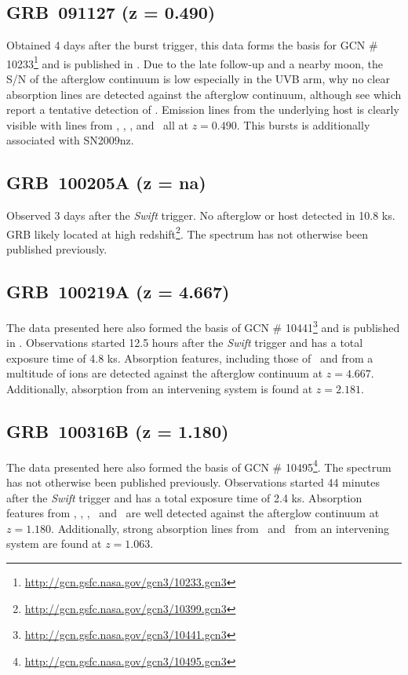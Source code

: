 \documentclass{aa}    %
\begin{document}
\subsection{GRB~091127 (z = 0.490)}
Obtained 4 days after the burst trigger, this data forms the basis for GCN \#
10233\footnote{\url{http://gcn.gsfc.nasa.gov/gcn3/10233.gcn3}} and is published
in \citet{Vergani2011}. Due to the late follow-up and a nearby moon, the S/N of
the afterglow continuum is low especially in the UVB arm, why no clear
absorption lines are detected against the afterglow continuum, although see
\citet{Vergani2011} which report a tentative detection of \mgii. Emission lines
from the underlying host is clearly visible with lines from \oii, \hb, \oiii,
and \ha~all at $z = 0.490$. This bursts is additionally associated with
SN2009nz.

\subsection{GRB~100205A  (z = na)}
Observed 3 days after the \textit{Swift} trigger. No afterglow or host detected
in 10.8 ks. GRB likely located at high
redshift\footnote{\url{http://gcn.gsfc.nasa.gov/gcn3/10399.gcn3}}. The spectrum
has not otherwise been published previously.

\subsection{GRB~100219A (z = 4.667)}
The data presented here also formed the basis of GCN \#
10441\footnote{\url{http://gcn.gsfc.nasa.gov/gcn3/10441.gcn3}} and is published
in \citet{Thone2013}. Observations started 12.5 hours after the \textit{Swift}
trigger and has a total exposure time of 4.8 ks. Absorption features, including
those of \lya~and from a multitude of ions are detected against the afterglow
continuum at $z = 4.667$. Additionally, absorption from an intervening system
is found at $z = 2.181$.

\subsection{GRB~100316B (z = 1.180)}
The data presented here also formed the basis of GCN \#
10495\footnote{\url{http://gcn.gsfc.nasa.gov/gcn3/10495.gcn3}}. The spectrum
has not otherwise been published previously. Observations started 44 minutes
after the \textit{Swift} trigger and has a total exposure time of 2.4 ks.
Absorption features from \feii, \alii, \aliii,	\mgii~and \mgi~are well detected
against the afterglow continuum at $z = 1.180$. Additionally, strong absorption
lines from \feii~and \mgii~from an intervening system are found at $z = 1.063$.
\end{document}
